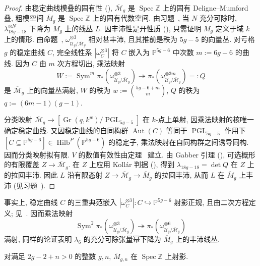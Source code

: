 \begin{proof}
由稳定曲线模叠的固有性 (), $\overline{\mathcal M}_g$ 是 $\operatorname{Spec}\mathbb Z$ 上的固有 Deligne--Mumford 叠, 粗模空间 $\overline M_g$ 是 $\operatorname{Spec}\mathbb Z$ 上的固有代数空间. 由习题~, 当 $N$ 充分可除时, $\lambda_{18g-18}^{\otimes N}$ 下降为 $\overline M_g$ 上的线丛 $L$. 因丰沛性是开性质 (), 只需证明 $\overline M_g$ 定义于域 $k$ 上的情形. 由命题~, $\omega_{\mathcal U_g/\overline{\mathcal M}_g}^{\otimes3}$ 相对甚丰沛, 且其推前是秩为 $5g-5$ 的向量丛. 对亏格 $g$ 的稳定曲线 $C$, 完全线性系 $|\omega_C^{\otimes3}|$ 将 $C$ 嵌入为 $\mathbb P^{5g-6}$ 中次数 $m:=6g-6$ 的曲线. 因为 $C$ 由 $m$ 次方程切出, 乘法映射
\[
W:=\operatorname{Sym}^m\pi_*(\omega_{\mathcal U_g/\overline{\mathcal M}_g}^{\otimes3})\twoheadrightarrow\pi_*(\omega_{\mathcal U_g/\overline{\mathcal M}_g}^{\otimes3m})=:Q
\]
是 $\overline{\mathcal M}_g$ 上的向量丛满射, $W$ 的秩为 $w:=\binom{5g-6+m}{m}$, $Q$ 的秩为 $q:=(6m-1)(g-1)$.

分类映射 $\overline{\mathcal M}_g\to[\operatorname{Gr}(q,\allowbreak k^w)/\operatorname{PGL}_{5g-5}]$ 在 $k$-点上单射, 因乘法映射的核唯一确定稳定曲线. 又因稳定曲线的自同构群 $\operatorname{Aut}(C)$ 等同于 $\operatorname{PGL}_{5g-5}$ 作用下 $[C\subseteq\mathbb P^{5g-6}]\in\operatorname{Hilb}^P(\mathbb P^{5g-6})$ 的稳定子, 乘法映射在自同构群之间诱导同构. 因而分类映射拟有限. $V$ 的数值有效性由定理~ 建立. 由 Gabber 引理 (), 可选概形的有限覆盖 $Z\to\overline{\mathcal M}_g$. 在 $Z$ 上应用 Kollár 判据 (), 得到 $\lambda_{18g-18}=\det Q$ 在 $Z$ 上的拉回丰沛. 因此 $L$ 沿有限态射 $Z\to\overline{\mathcal M}_g\to\overline M_g$ 的拉回丰沛, 从而 $L$ 在 $\overline M_g$ 上丰沛 (见习题~).
\end{proof}
\begin{remark}\label{src:6.9.4}
事实上, 稳定曲线 $C$ 的三重典范嵌入 $|\omega_C^{\otimes3}|:C\hookrightarrow\mathbb P^{5g-6}$ 射影正规, 且由二次方程定义; 见~\cite[58 页]{Mum70b}. 因而乘法映射
\[
\operatorname{Sym}^2\pi_*(\omega_{\mathcal U_g/\overline{\mathcal M}_g}^{\otimes3})\twoheadrightarrow\pi_*(\omega_{\mathcal U_g/\overline{\mathcal M}_g}^{\otimes6})
\]
满射, 同样的论证表明 $\lambda_6$ 的充分可除张量幂下降为 $\overline M_g$ 上的丰沛线丛.
\end{remark}
\begin{corollary}\label{src:6.9.5}
对满足 $2g-2+n>0$ 的整数 $g,\allowbreak n$, $\overline M_{g,\allowbreak n}$ 在 $\operatorname{Spec}\mathbb Z$ 上射影.
\end{corollary}
